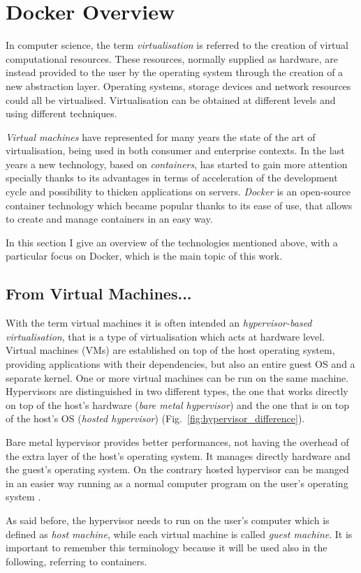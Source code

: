 \documentclass[a4paper,12pt]{article}
\def\myfig#1{Fig.~#1\xspace}
\begin{document}
\newpage

\section{Docker Overview}
\label{sec:docker_overview}

In computer science, the term \textit{virtualisation}
\cite{wikipedia_virtualization} is referred to the creation of virtual
computational resources. These resources, normally supplied as hardware, are
instead provided to the user by the operating system through the creation of a
new abstraction layer. Operating systems, storage devices and network resources
could all be virtualised. Virtualisation can be obtained at different levels and
using different techniques. \par\textit{Virtual machines} have represented for
many years the state of the art of virtualisation, being used in both consumer
and enterprise contexts. In the last years a new technology, based on
\textit{containers}, has started to gain more attention specially thanks to its
advantages in terms of acceleration of the development cycle and possibility to
thicken applications on servers. \textit{Docker} is an open-source container
technology which became popular thanks to its ease of use, that allows to
create and manage containers in an easy way. \par In this section I give an
overview of the technologies mentioned above, with a particular focus on Docker,
which is the main topic of this work.

\subsection{From Virtual Machines...}

With the term virtual machines it is often intended an \textit{hypervisor-based
virtualisation}, that is a type of virtualisation which acts at hardware level.
Virtual machines (VMs) are established on top of the host operating system,
providing applications with their dependencies, but also an entire guest OS and
a separate kernel. One or more virtual machines can be run on the same machine.
Hypervisors are distinguished in two different types, the one that works
directly on top of the host's hardware (\textit{bare metal hypervisor}) and the
one that is on top of the host's OS (\textit{hosted hypervisor})
(\myfig{\ref{fig:hypervisor_difference}}). \par Bare metal hypervisor provides
better performances, not having the overhead of the extra layer of the host's
operating system. It manages directly hardware and the guest's operating system.
On the contrary hosted hypervisor can be manged in an easier way running as a
normal computer program on the user's operating
system \cite{bui_docker_security}. \par As said before, the hypervisor needs to
run on the user's computer which is defined as \textit{host machine}, while each
virtual machine is called \textit{guest machine}. It is important to remember
this terminology because it will be used also in the following, referring to
containers. 
\end{document}
